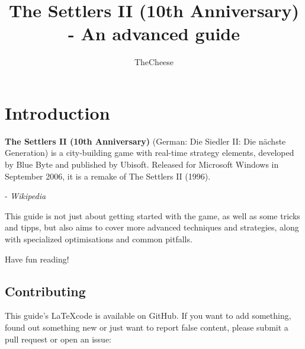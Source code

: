 \documentclass{article}
\title{The Settlers II (10th Anniversary) - An advanced guide}
\author{TheCheese}
\date{}
\begin{document}
\maketitle

\vspace{2cm}

\tableofcontents

\section{Introduction}

\begin{displayquote}
\textbf{The Settlers II (10th Anniversary)} (German: Die Siedler II: Die nächste Generation) is a city-building game with real-time strategy elements, developed by Blue Byte and published by Ubisoft. Released for Microsoft Windows in September 2006, it is a remake of The Settlers II (1996).
\end{displayquote}
\hspace{2cm}- \textit{Wikipedia}

This guide is not just about getting started with the game, as well as some tricks and tipps, but also aims to cover more advanced techniques and strategies, along with specialized optimisations and common pitfalls.

Have fun reading!

\subsection{Contributing}

This guide's \LaTeX code is available on GitHub. If you want to add something, found out something new or just want to report false content, please submit a pull request or open an issue: 
\end{document}
